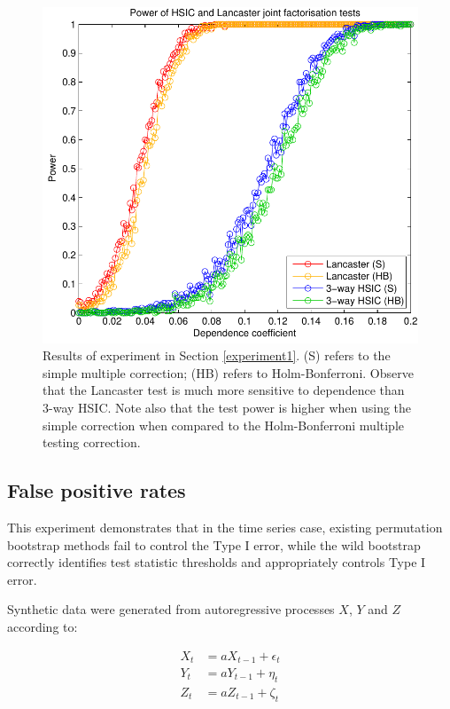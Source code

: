 \documentclass[]{article}
\begin{document}
\begin{figure}[ht]
\vskip 0.2in
\begin{center}
\centerline{\includegraphics[scale=0.6]{UAI_Figure1.pdf}}
\caption{Results of experiment in Section \ref{experiment1}. (S) refers to the simple multiple correction; (HB) refers to Holm-Bonferroni. Observe that the Lancaster test is much more sensitive to dependence than 3-way HSIC. Note also that the test power is higher when using the simple correction when compared to the Holm-Bonferroni multiple testing correction.}
\label{weak-pairwise-strong-joint}
\end{center}
\vskip -0.2in
\end{figure} 

\subsection{False positive rates}\label{experiment2}

This experiment demonstrates that in the time series case, existing permutation bootstrap methods fail to control the Type I error, while the  wild bootstrap correctly identifies test statistic thresholds and appropriately controls Type I error.

Synthetic data were generated from autoregressive processes $X$, $Y$ and $Z$ according to:

\begin{align*}
X_t &= aX_{t-1} + \epsilon_t\\
Y_t &= aY_{t-1} + \eta_t\\
Z_t &= aZ_{t-1} +  \zeta_t\\
\end{align*}
\end{document}
